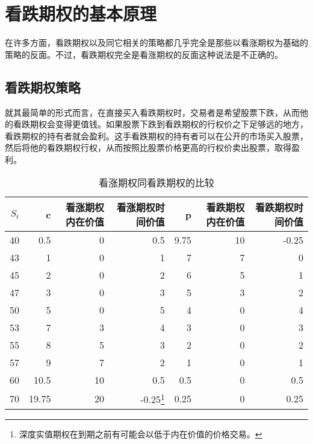\chapter{看跌期权的基本原理\label{CH15}}
在许多方面，看跌期权以及同它相关的策略都几乎完全是那些以看涨期权为基础的策略的反面。不过，看跌期权完全是看涨期权的反面这种说法是不正确的。
\section{看跌期权策略}
就其最简单的形式而言，在直接买入看跌期权时，交易者是希望股票下跌，从而他的看跌期权会变得更值钱。如果股票下跌到看跌期权的行权价之下足够远的地方，看跌期权的持有者就会盈利。这手看跌期权的持有者可以在公开的市场买入股票，然后将他的看跌期权行权，从而按照比股票价格更高的行权价卖出股票，取得盈利。

\begin{table}[!ht]
    \centering
    \caption{看涨期权同看跌期权的比较}
    \label{tbl:15-1}
    \begin{tabular}{rrrrrrr}
        \hline
        $S_t$ & c     & 看涨期权内在价值 & 看涨期权时间价值                                     & p    & 看跌期权内在价值 & 看跌期权时间价值 \\ \hline
        40    & 0.5   & 0        & 0.5                                          & 9.75 & 10       & -0.25    \\
        43    & 1     & 0        & 1                                            & 7    & 7        & 0        \\
        45    & 2     & 0        & 2                                            & 6    & 5        & 1        \\
        47    & 3     & 0        & 3                                            & 5    & 3        & 2        \\
        50    & 5     & 0        & 5                                            & 4    & 0        & 4        \\
        53    & 7     & 3        & 4                                            & 3    & 0        & 3        \\
        55    & 8     & 5        & 3                                            & 2    & 0        & 2        \\
        57    & 9     & 7        & 2                                            & 1    & 0        & 1        \\
        60    & 10.5  & 10       & 0.5                                          & 0.5  & 0        & 0.5      \\
        70    & 19.75 & 20       & -0.25\footnote{深度实值期权在到期之前有可能会以低于内在价值的价格交易。} & 0.25 & 0        & 0.25     \\ \hline
    \end{tabular}
\end{table}

